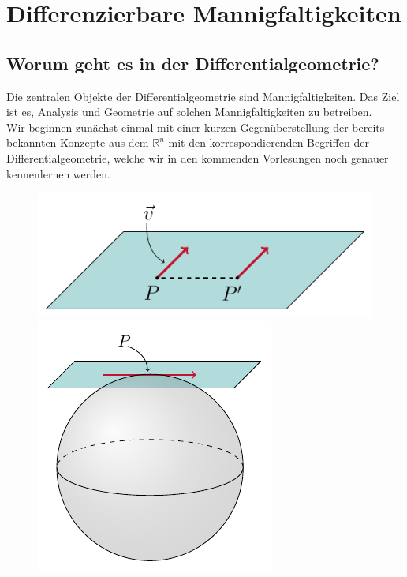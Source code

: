 \chapter{Differenzierbare Mannigfaltigkeiten}
\section*{Worum geht es in der Differentialgeometrie?}
Die zentralen Objekte der Differentialgeometrie sind Mannigfaltigkeiten. Das Ziel ist es, Analysis und Geometrie auf solchen Mannigfaltigkeiten zu betreiben. \\
Wir beginnen zunächst einmal mit einer kurzen Gegenüberstellung der bereits bekannten Konzepte aus dem $\mathbb{R}^n$ mit den korrespondierenden Begriffen der Differentialgeometrie, welche wir in den kommenden Vorlesungen noch genauer kennenlernen werden.

\begin{figure}[H]
\includegraphics[scale=0.8]{figures/tikz/plane.pdf}
\hspace{2cm}
\includegraphics[scale=0.9]{figures/tikz/sphere_with_plane.pdf}
\end{figure}

